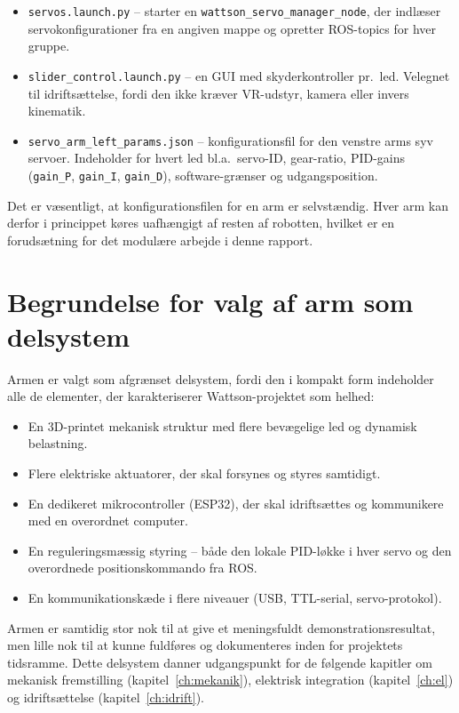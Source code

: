 \begin{itemize}
    \item \texttt{servos.launch.py} -- starter en
          \texttt{wattson\_servo\_manager\_node}, der indlæser
          servokonfigurationer fra en angiven mappe og opretter
          ROS-topics for hver gruppe.
    \item \texttt{slider\_control.launch.py} -- en GUI med skyderkontroller
          pr.\ led. Velegnet til idriftsættelse, fordi den ikke kræver
          VR-udstyr, kamera eller invers kinematik.
    \item \texttt{servo\_arm\_left\_params.json} -- konfigurationsfil for
          den venstre arms syv servoer. Indeholder for hvert led bl.a.\
          servo-ID, gear-ratio, PID-gains (\texttt{gain\_P},
          \texttt{gain\_I}, \texttt{gain\_D}), software-grænser og
          udgangsposition.
\end{itemize}

Det er væsentligt, at konfigurationsfilen for en arm er selvstændig.
Hver arm kan derfor i princippet køres uafhængigt af resten af robotten,
hvilket er en forudsætning for det modulære arbejde i denne rapport.

\section{Begrundelse for valg af arm som delsystem}

Armen er valgt som afgrænset delsystem, fordi den i kompakt form
indeholder alle de elementer, der karakteriserer Wattson-projektet som
helhed:

\begin{itemize}
    \item En 3D-printet mekanisk struktur med flere bevægelige led
          og dynamisk belastning.
    \item Flere elektriske aktuatorer, der skal forsynes og styres
          samtidigt.
    \item En dedikeret mikrocontroller (ESP32), der skal idriftsættes
          og kommunikere med en overordnet computer.
    \item En reguleringsmæssig styring -- både den lokale PID-løkke i
          hver servo og den overordnede positionskommando fra ROS.
    \item En kommunikationskæde i flere niveauer (USB, TTL-serial,
          servo-protokol).
\end{itemize}

\noindent Armen er samtidig stor nok til at give et meningsfuldt
demonstrationsresultat, men lille nok til at kunne fuldføres og
dokumenteres inden for projektets tidsramme. Dette delsystem danner
udgangspunkt for de følgende kapitler om mekanisk fremstilling
(kapitel~\ref{ch:mekanik}), elektrisk integration (kapitel~\ref{ch:el})
og idriftsættelse (kapitel~\ref{ch:idrift}).
